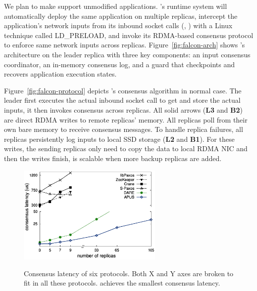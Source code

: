 We plan to make \falcon support unmodified applications. \falcon's runtime 
system will automatically deploy the same application on multiple replicas, 
intercept the application's network inputs from its inbound socket calls (\eg, 
\recv) with a Linux technique called LD\_PRELOAD, and invoke its RDMA-based 
consensus protocol to enforce same network inputs across replicas. 
Figure~\ref{fig:falcon-arch} shows \falcon's architecture on the leader replica 
with three key components: an input consensus coordinator, an in-memory 
consensus log, and a guard that checkpoints and recovers application execution 
states.

Figure~\ref{fig:falcon-protocol} depicts \falcon's consensus algorithm in 
normal case. The leader first executes the actual inbound socket call to get 
and store the actual inputs, it then invokes consensus across replicas. All 
solid arrows (\textbf{L3} and \textbf{B2}) are direct RDMA writes to remote 
replicas' memory. All replicas poll from their own bare memory to receive 
consensus messages. To handle replica failures, all replicas persistently log 
inputs to local SSD storage (\textbf{L2} and \textbf{B1}). For these writes, 
the sending replicas only need to copy the data to local RDMA NIC and then the 
writes finish, \falcon is scalable when more backup replicas are added.




\begin{figure}
  \vspace{-.1in}
  \includegraphics[width=7cm]{figures/traditional_paxos_latency.ps}\\
  \vspace{-.3in}
  \caption{Consensus latency of six \paxos protocols. Both X and Y axes are 
broken to fit in all these protocols. \falcon achieves the smallest consensus 
latency.}
  \label{fig:scalability}
\end{figure}

